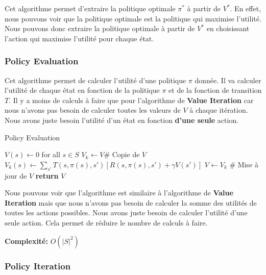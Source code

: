 Cet algorithme permet d'extraire la politique optimale $\pi^*$ à partir de $V^*$. 
En effet, nous pouvons voir que la politique optimale est la politique qui maximise l'utilité. 
Nous pouvons donc extraire la politique optimale à partir de $V^*$ en choisissant l'action qui maximise l'utilité pour chaque état.


\subsubsection{Policy Evaluation} %
\label{sec:policy_evaluation}

Cet algorithme permet de calculer l'utilité d'une politique $\pi$ donnée. 
Il va calculer l'utilité de chaque état en fonction de la politique $\pi$ et de la fonction de transition $T$. 
Il y a moins de calculs à faire que pour l'algorithme de \textbf{Value Iteration} car nous n'avons pas besoin de calculer toutes les valeurs de $V$ à chaque itération. 
Nous avons juste besoin l'utilité d'un état en fonction \textbf{d'une seule} action.

\begin{algorithm}[H]
    \caption{Policy Evaluation}\label{alg:policyevaluation}
    \begin{algorithmic}[1]
            \State $V(s) \gets 0$ for all $s \in S$
            \Repeat
                \State $V_k \gets V$\# Copie de $V$
                    \State $V_k(s) \gets \sum_{s'} T(s, \pi(s), s') \left[ R(s, \pi(s), s') + \gamma V(s') \right]$
                \EndFor
                \State $V \gets V_k$ \# Mise à jour de $V$
            \State \textbf{return} $V$
        \EndProcedure
    \end{algorithmic} 
\end{algorithm}

Nous pouvons voir que l'algorithme est similaire à l'algorithme de \textbf{Value Iteration} mais que nous n'avons pas besoin de calculer 
la somme des utilités de toutes les actions possibles. Nous avons juste besoin de calculer l'utilité d'une seule action. 
Cela permet de réduire le nombre de calculs à faire.

\textbf{Complexité:} $O(|S|^2)$

\subsubsection{Policy Iteration} %
\label{sec:policy_iteration}

